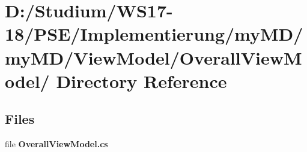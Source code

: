\hypertarget{dir_D_3A_2FStudium_2FWS17_2D18_2FPSE_2FImplementierung_2FmyMD_2FmyMD_2FViewModel_2FOverallViewModel_2F}{
\section{D:/Studium/WS17-18/PSE/Implementierung/my\-MD/my\-MD/View\-Model/Overall\-View\-Model/ Directory Reference}
\label{dir_D_3A_2FStudium_2FWS17_2D18_2FPSE_2FImplementierung_2FmyMD_2FmyMD_2FViewModel_2FOverallViewModel_2F}
}


\subsection*{Files}
\begin{CompactItemize}
\item 
file {\bf Overall\-View\-Model.cs}
\end{CompactItemize}
